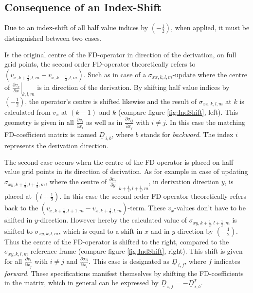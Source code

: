 \documentclass[pdftex,a4paper,parskip,listof=totoc,bibliography=totoc,onehalfspacing,12pt]{scrreprt}
\begin{document}
\subsection{Consequence of an Index-Shift}

Due to an index-shift of all half value indices by $(-\frac{1}{2})$, when applied, it must be distinguished between two cases. 

Is the original centre of the FD-operator in direction of the derivation, on full grid points, the second order FD-operator theoretically refers to $\left(v_{x,k+\frac{1}{2},l,m} - v_{x,k-\frac{1}{2},l,m}\right)$. Such as in case of a $\sigma_{xx,k,l,m}$-update where the centre of $\left. \frac{\partial v_x}{\partial x} \right\rvert_{k,l,m}$ is in direction of the derivation. By shifting half value indices by $(-\frac{1}{2})$, the operator's centre is shifted likewise and the result of $\sigma_{xx,k,l,m}$ at $k$ is calculated from $v_x$ at $(k-1)$ and $k$ (compare figure \ref{fig:IndShift}, left). This geometry is given in all $\frac{\partial v_i}{\partial x_i}$ as well as in $\frac{\partial \sigma_{ij}}{\partial x_j}$ with $i\neq j$. In this case the matching FD-coefficient matrix  is named $\underline{D}_{\,i,b}$, where $b$ stands for \textit{backward}. The index $i$ represents the derivation direction.

The second case occurs when the centre of the FD-operator is placed on half value grid points in its direction of derivation. As for example in case of  updating $\sigma_{xy,k+\frac{1}{2},l+\frac{1}{2},m}$, where the centre of $\left. \frac{\partial v_x}{\partial y} \right\rvert_{k+\frac{1}{2},l+\frac{1}{2},m}$, in derivation direction $y$, is placed at $(l+\frac{1}{2})$. In this case the second order FD-operator theoretically refers back to the $\left(v_{x,k+\frac{1}{2},l+1,m} - v_{x,k+\frac{1}{2},l,m}\right)$-term. These $v_x$-values don't have to be shifted in $y$-direction. However hereby the calculated value of $\sigma_{xy,k+\frac{1}{2},l+\frac{1}{2},m}$ is shifted to $\sigma_{xy,k,l,m}$, which is equal to a shift in $x$ and in $y$-direction by $(-\frac{1}{2})$. Thus the centre of the FD-operator is shifted to the right, compared to the $\sigma_{xy,k,l,m}$ reference frame (compare figure \ref{fig:IndShift}, right). This shift is given for all $\frac{\partial v_i}{\partial x_j}$ with $i\neq j$ and $\frac{\partial \sigma_{ii}}{\partial x_i}$. This case is designated as $\underline{D}_{\,i,f}$, where $f$ indicates \textit{forward}.
These specifications manifest themselves by shifting the FD-coefficients in the matrix, which in general can be expressed by $\underline{D}_{\,i,f} = -\underline{D}_{\,i,b}^T$.
\end{document}
